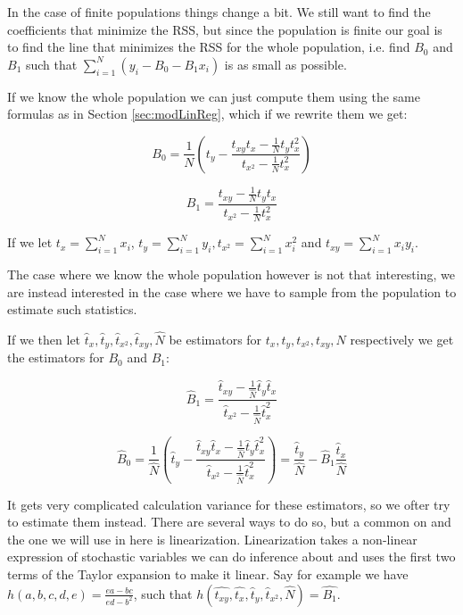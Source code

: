 \documentclass{article}
\begin{document}
In the case of finite populations things change a bit. We still want to find the
coefficients that minimize the RSS, but since the population is finite our goal
is to find the line that minimizes the RSS for the whole population, i.e. find
\(B_0\) and \(B_1\) such that \(\sum_{i = 1}^N (y_i - B_0 - B_1 x_i)\) is as small as
possible.

If we know the whole population we can just compute them using the same formulas
as in Section \ref{sec:modLinReg}, which if we rewrite them we get:

\begin{equation*}
  B_0 = \frac{1}{N} \left( t_y - \frac{t_{xy} t_x - \frac{1}{N} t_y t_x^2}
    {t_{x^2} - \frac{1}{N} t_x^2}
   \right)
\end{equation*}

\begin{equation*}
  B_1 = \frac{t_{xy} - \frac{1}{N} t_y t_x}
    {t_{x^2} - \frac{1}{N} t_x^2}
\end{equation*}

If we let \(t_x = \sum_{i = 1}^N x_i\), \(t_y = \sum_{i = 1}^N y_i, t_{x^2} =
\sum_{i = 1}^N x_i^2\) and \(t_{xy} =
\sum_{i = 1}^N x_i y_i\).


The case where we know the whole population however is not that interesting, we are instead interested in the case where we have to sample from the
population to estimate such statistics.

If we then let \(\hat{t}_x, \hat{t}_y, \hat{t}_{x^2}, \hat{t}_{xy}, \hat{N}\) be estimators
for \(t_x, t_y, t_{x^2},
t_{xy}, N\) respectively we get the estimators for \(B_0\) and \(B_1\):

\begin{equation*}
  \hat{B}_1 = \frac{\hat{t}_{xy} - \frac{1}{\widehat{N}} \hat{t}_y \hat{t}_x}
    {\hat{t}_{x^2} - \frac{1}{\widehat{N}} \hat{t}_x^2}
\end{equation*}

\begin{equation*}
  \hat{B}_0 = \frac{1}{\widehat{N}} \left( \hat{t}_y - \frac{\hat{t}_{xy} \hat{t}_x - \frac{1}{\widehat{N}} \hat{t}_y \hat{t}_x^2}
    {\hat{t}_{x^2} - \frac{1}{\widehat{N}} \hat{t}_x^2}
  \right)
  = \frac{\hat{t}_y}{\hat{N}} - \hat{B}_1\frac{\hat{t}_x}{\hat{N}}
\end{equation*}

It gets very complicated calculation variance for these estimators, so we ofter
try to estimate them instead. There are several ways to do so, but a common on
and the one we will use in here is linearization. Linearization takes a
non-linear expression of stochastic variables we can do inference about and uses
the first two terms of the Taylor expansion to make it linear.
Say for example we have \(h(a, b, c, d, e) = \frac{ea - bc}{ed - b^2}\), such that
\(h(\hat{t_{xy}}, \hat{t_x}, \hat{t}_y, \hat{t}_{x^2}, \hat{N}) = \hat{B_1}\).
\end{document}
